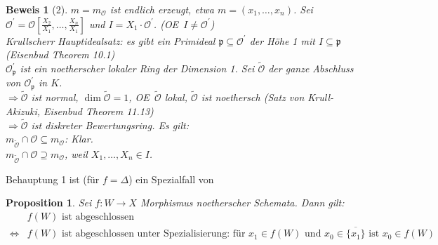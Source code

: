 \documentclass[a4paper,oneside]{scrbook}
\theoremstyle{break}
\newtheorem{Prop}[Def]{Proposition}
\theoremstyle{nonumberbreak}
\theoremstyle{nonumberplain}
\newtheorem{Bew}{Beweis}
\theoremstyle{break}
\renewcommand{\OE}{O\!\!E~}
\begin{document}
\begin{Bew}[2]
  $m=m_{\mathcal O}$ ist endlich erzeugt, etwa $m=(x_1,\dots,x_n)$. Sei $\mathcal O^\prime=\mathcal O[\frac{X_2}{X_1},\dots,\frac{X_n}{X_1}]$
  und $I=X_1\cdot\mathcal O^\prime$. (\OE $I\neq\mathcal O^\prime$) \\
  Krullscherr Hauptidealsatz: es gibt ein Primideal $\mathfrak p\subseteq\mathcal O^\prime$ der Höhe 1 mit $I\subseteq\mathfrak p$
  (Eisenbud Theorem 10.1) \\
  $\mathcal O^\prime_{\mathfrak p}$ ist ein noetherscher lokaler Ring der Dimension 1. Sei $\tilde{\mathcal O}$ der ganze Abschluss von
  $\mathcal O^\prime_{\mathfrak p}$ in $K$. \\
  $\Rightarrow\tilde{\mathcal O}$ ist normal, $\dim\tilde{\mathcal O}=1$, \OE$\tilde{\mathcal O}$ lokal, $\tilde{\mathcal O}$ ist noethersch
  (Satz von Krull-Akizuki, Eisenbud Theorem 11.13) \\
  $\Rightarrow\tilde{\mathcal O}$ ist diskreter Bewertungsring. Es gilt: \\
  $m_{\tilde{\mathcal O}}\cap\mathcal O\subseteq m_{\mathcal O}$: Klar. \\
  $m_{\tilde{\mathcal O}}\cap\mathcal O\supseteq m_{\mathcal O}$, weil $X_1,\dots,X_n\in I$.
\end{Bew}
Behauptung 1 ist (für $f=\Delta$) ein Spezialfall von 
\begin{Prop}
  \label{prop:7.5}
  Sei $f:W\to X$ Morphismus noetherscher Schemata. Dann gilt: 
  \begin{align*}
     & f(W) \text{ ist abgeschlossen }  \\
     \Leftrightarrow & f(W) \text{ ist abgeschlossen unter Spezialisierung: für } x_1\in f(W)\text{ und } x_0\in\overline{\{x_1\}}\text{ ist } x_0\in f(W)
  \end{align*}
\end{Prop}
\end{document}
